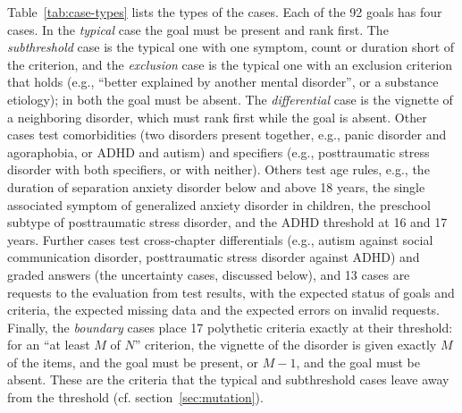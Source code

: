 Table~\ref{tab:case-types} lists the types of the cases. Each of the
92 goals has four cases. In the \emph{typical} case the goal must be present
and rank first. The \emph{subthreshold} case is the typical one with one
symptom, count or duration short of the criterion, and the \emph{exclusion} case
is the typical one with an exclusion criterion that holds (e.g., ``better
explained by another mental disorder'', or a substance etiology); in both the
goal must be absent. The \emph{differential} case is the vignette of a
neighboring disorder, which must rank first while the goal is absent. Other cases test comorbidities (two disorders present together, e.g., panic
disorder and agoraphobia, or ADHD and autism) and specifiers (e.g.,
posttraumatic stress disorder with both specifiers, or with neither). Others
test age rules, e.g., the duration of separation anxiety disorder below and
above 18 years, the single associated symptom of generalized anxiety disorder in
children, the preschool subtype of posttraumatic stress disorder, and the ADHD
threshold at 16 and 17 years. Further cases test cross-chapter differentials
(e.g., autism against social communication disorder, posttraumatic stress
disorder against ADHD) and graded answers (the uncertainty cases, discussed
below), and 13 cases are requests to the evaluation from test results, with the
expected status of goals and criteria, the expected missing data and the
expected errors on invalid requests. Finally, the \emph{boundary} cases place 17
polythetic criteria exactly at their threshold: for an ``at least $M$ of $N$''
criterion, the vignette of the disorder is given exactly $M$ of the items, and
the goal must be present, or $M-1$, and the goal must be absent. These are the
criteria that the typical and subthreshold cases leave away from the threshold
(cf. section~\ref{sec:mutation}).

